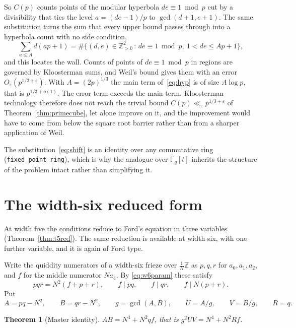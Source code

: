 \documentclass[11pt]{article}
\theoremstyle{plain}
\newtheorem{theorem}{Theorem}[section]
\theoremstyle{definition}
\newcommand{\Z}{\mathbb{Z}}
\newcommand{\F}{\mathbb{F}}
\newcommand{\lat}{\tfrac{1}{N}\Z}
\begin{document}
So $C(p)$ counts points of the modular hyperbola $de\equiv1\bmod p$ cut by a divisibility
that ties the level $a=(de-1)/p$ to $\gcd(d+1,e+1)$. The same substitution turns the sum
that every upper bound passes through into a hyperbola count with no side condition,
\begin{equation}\label{eq:hyp}
  \sum_{a\le A}d(ap+1)=\#\{(d,e)\in\Z_{>0}^2 \,:\, de\equiv1\bmod p,\ 1<de\le Ap+1\},
\end{equation}
and this locates the wall. Counts of points of $de\equiv1\bmod p$ in regions are governed by
Kloosterman sums, and Weil's bound gives them with an error $O_\varepsilon(p^{1/2+\varepsilon})$.
With $A=(2p)^{1/3}$ the main term of~\eqref{eq:hyp} is of size $A\log p$, that is
$p^{1/3+o(1)}$. The error term exceeds the main term. Kloosterman technology therefore does
not reach the trivial bound $C(p)\ll_\varepsilon p^{1/3+\varepsilon}$ of
Theorem~\ref{thm:primecube}, let alone improve on it, and the improvement would have to come
from below the square root barrier rather than from a sharper application of Weil.

The substitution~\eqref{eq:shift} is an identity over any commutative ring
(\texttt{fixed\_point\_ring}), which is why the analogue over $\F_q[t]$ inherits the
structure of the problem intact rather than simplifying it.

\section{The width-six reduced form}\label{sec:w6red}

At width five the conditions reduce to Ford's equation in three variables
(Theorem~\ref{thm:t5red}). The same reduction is available at width six, with one further
variable, and it is again of Ford type.

Write the quiddity numerators of a width-six frieze over $\lat$ as $p,q,r$ for
$a_0,a_1,a_2$, and $f$ for the middle numerator $Na_4$. By \eqref{eq:w6param} these satisfy
\begin{equation}\label{eq:w6def}
  pqr=N^2(f+p+r),\qquad f\mid pq,\qquad f\mid qr,\qquad f\mid N(p+r).
\end{equation}
Put
\[
  A=pq-N^2,\qquad B=qr-N^2,\qquad g=\gcd(A,B),\qquad U=A/g,\qquad V=B/g,\qquad R=q .
\]

\begin{theorem}[Master identity]\label{thm:w6master}
$AB=N^4+N^2qf$, that is $g^2UV=N^4+N^2Rf$.
\end{theorem}
\end{document}
